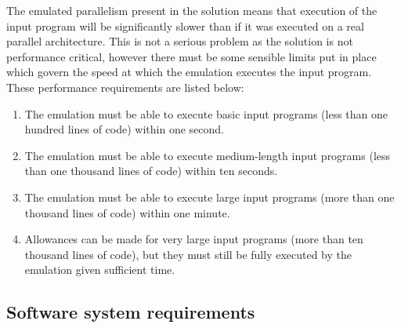 \documentclass[a4paper, 12pt]{article}
\begin{document}
The emulated parallelism present in the solution means that execution of the input program will be significantly slower than if it was executed on a real parallel architecture. This is not a serious problem as the solution is not performance critical, however there must be some sensible limits put in place which govern the speed at which the emulation executes the input program. These performance requirements are listed below:
\begin{enumerate}[leftmargin=*,labelindent=15pt,label=\bfseries 3.\arabic*] 
	\item The emulation must be able to execute basic input programs (less than one hundred lines of code) within one second.
	\item The emulation must be able to execute medium-length input programs (less than one thousand lines of code) within ten seconds.
	\item The emulation must be able to execute large input programs (more than one thousand lines of code) within one minute.
	\item Allowances can be made for very large input programs (more than ten thousand lines of code), but they must still be fully executed by the emulation given sufficient time.
\end{enumerate}

\subsection{Software system requirements}
\end{document}
